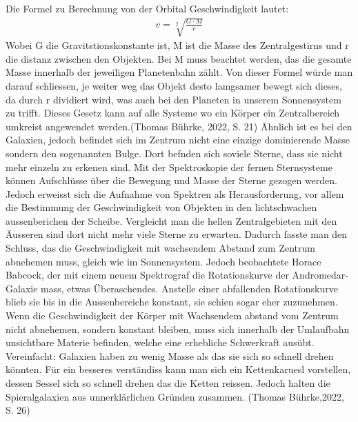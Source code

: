Die Formel zu Berechnung von der Orbital Geschwindigkeit lautet:
\begin{align*}    
    v = \sqrt[2]{\frac{G \cdot M}{r}}
\end{align*}
Wobei G die Gravitstionskonstante ist, M ist die Masse des Zentralgestirns und r die distanz zwischen den Objekten. Bei M muss 
beachtet werden, das die gesamte Masse innerhalb der jeweiligen Planetenbahn zählt. 
Von dieser Formel würde man darauf schliessen, je weiter weg das Objekt desto lamgsamer bewegt sich 
dieses, da durch r dividiert wird, was auch bei den Planeten in unserem Sonnensystem zu trifft. Dieses Gesetz kann auf alle
Systeme wo ein Körper ein Zentralbereich umkreist angewendet werden.(Thomas Bührke, 2022, S. 21)
Ähnlich ist es bei den Galaxien, jedoch befindet sich im Zentrum nicht eine einzige dominierende Masse sondern den sogenannten Bulge. Dort befnden 
sich soviele Sterne, dass sie nicht mehr einzeln zu erkenen sind. Mit der Spektroskopie der fernen Sternsysteme können Aufschlüsse über die Bewegung und Masse der Sterne
gezogen werden. Jedoch erweisst sich die Aufnahme von Spektren als Herausforderung, vor allem die Bestimmung der Geschwindigkeit von Objekten 
in den lichtschwachen aussenberichen der Scheibe. Vergleicht man die hellen Zentralgebieten mit den Äusseren sind dort nicht mehr viele Sterne zu erwarten.
Dadurch fasste man den Schluss, das die Geschwindigkeit mit wachsendem Abstand zum Zentrum abnehemen muss, gleich wie im Sonnensystem. 
Jedoch beobachtete Horace Babcock, der mit einem neuem Spektrograf die Rotationskurve der Andromedar-Galaxie mass, etwas Überaschendes. Anstelle einer abfallenden Rotationskurve
blieb sie bis in die Aussenbereiche konstant, sie schien sogar eher zuzunehmen. Wenn die Geschwindigkeit der Körper mit Wachsendem abstand vom Zentrum nicht abnehemen, sondern konstant bleiben, 
muss sich innerhalb der Umlaufbahn unsichtbare Materie befinden, welche eine erhebliche Schwerkraft ausübt. Vereinfacht: Galaxien haben zu wenig Masse als das sie sich so schnell drehen könnten.
Für ein besseres verständiss kann man sich ein Kettenkaruesl vorstellen, dessen Sessel sich so schnell drehen das die Ketten reissen. Jedoch halten die Spieralgalaxien aus unnerklärlichen Gründen zusammen. (Thomas Bührke,2022, S. 26)

